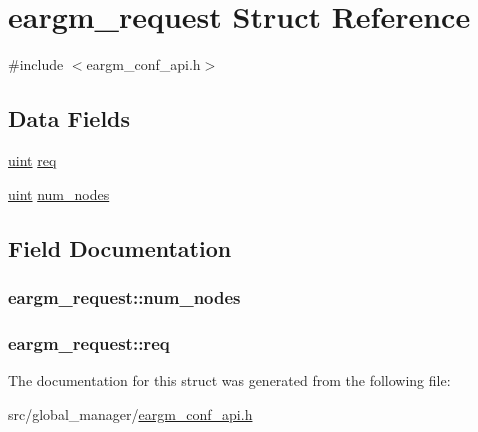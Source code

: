 \hypertarget{structeargm__request}{}\section{eargm\+\_\+request Struct Reference}
\label{structeargm__request}


{\ttfamily \#include $<$eargm\+\_\+conf\+\_\+api.\+h$>$}

\subsection*{Data Fields}
\begin{DoxyCompactItemize}
\item 
\hyperlink{generic_8h_a91ad9478d81a7aaf2593e8d9c3d06a14}{uint} \hyperlink{structeargm__request_ad25e8ebe7f96007a9f3f819e2783c148}{req}
\item 
\hyperlink{generic_8h_a91ad9478d81a7aaf2593e8d9c3d06a14}{uint} \hyperlink{structeargm__request_ada793490e3f7537474e3916fa9081f6f}{num\+\_\+nodes}
\end{DoxyCompactItemize}


\subsection{Field Documentation}
\subsubsection[{\texorpdfstring{num\+\_\+nodes}{num_nodes}}]{ eargm\+\_\+request\+::num\+\_\+nodes}\hypertarget{structeargm__request_ada793490e3f7537474e3916fa9081f6f}{}\label{structeargm__request_ada793490e3f7537474e3916fa9081f6f}
\subsubsection[{\texorpdfstring{req}{req}}]{ eargm\+\_\+request\+::req}\hypertarget{structeargm__request_ad25e8ebe7f96007a9f3f819e2783c148}{}\label{structeargm__request_ad25e8ebe7f96007a9f3f819e2783c148}


The documentation for this struct was generated from the following file\+:\begin{DoxyCompactItemize}
\item 
src/global\+\_\+manager/\hyperlink{eargm__conf__api_8h}{eargm\+\_\+conf\+\_\+api.\+h}\end{DoxyCompactItemize}
